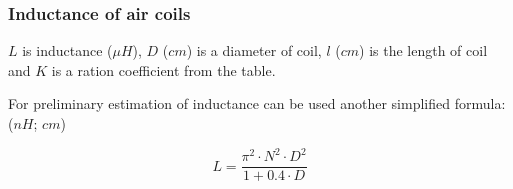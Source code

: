 \documentclass{beamer}
\begin{document}
	\begin{frame}
	\frametitle{Inductance of air coils}
	\begin{flushleft}
		$L$ is inductance ($\mu H$), $D$ ($cm$) is a diameter of coil, $l$ ($cm$) is the length of coil and $K$ is a ration coefficient from the table. 
	\end{flushleft}
	\begin{flushleft}
		For preliminary estimation of inductance can be used another simplified formula: ($nH$; $cm$) 
	\end{flushleft}
	$$L=\frac{\pi^2\cdot N^2 \cdot D^2}{1+0.4\cdot D}$$
  \end{frame}
\end{document}
